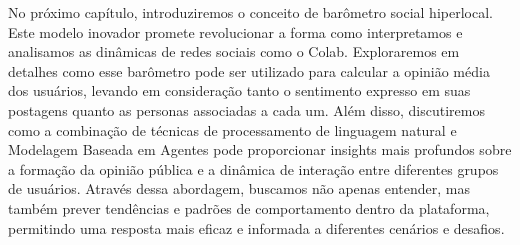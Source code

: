 No próximo capítulo, introduziremos o conceito de barômetro social hiperlocal. Este modelo inovador promete revolucionar a forma como interpretamos e analisamos as dinâmicas de redes sociais como o Colab. Exploraremos em detalhes como esse barômetro pode ser utilizado para calcular a opinião média dos usuários, levando em consideração tanto o sentimento expresso em suas postagens quanto as personas associadas a cada um. Além disso, discutiremos como a combinação de técnicas de processamento de linguagem natural e Modelagem Baseada em Agentes pode proporcionar insights mais profundos sobre a formação da opinião pública e a dinâmica de interação entre diferentes grupos de usuários. Através dessa abordagem, buscamos não apenas entender, mas também prever tendências e padrões de comportamento dentro da plataforma, permitindo uma resposta mais eficaz e informada a diferentes cenários e desafios.
